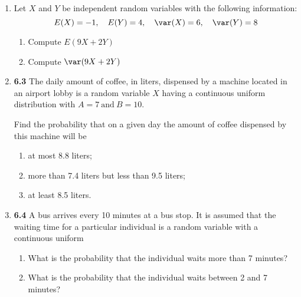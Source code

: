 \documentclass[basic, header]{nosvagor-notes}
\begin{document}
\begin{enumerate}[leftmargin=1.5em, itemsep=2em]
\begin{enumerate}[leftmargin=1.6em]
    \end{enumerate}

  \newpage %

  \item Let \(X\) and \(Y\) be independent random variables with the following
    information:
    \[%
     E(X) = -1, \quad E(Y) = 4, \quad \var(X) = 6, \quad \var(Y) = 8
    \]%
    \begin{enumerate}[leftmargin=1.6em]

      \item Compute \(E(9X + 2Y)\)
      \item Compute \(\var(9X + 2Y)\)

    \end{enumerate}

  \item \textbf{6.3} The daily amount of coffee, in liters, dispensed by a
    machine located in an airport lobby is a random variable \(X\) having a
    continuous uniform distribution with \(A = 7 ~\text{and}~ B = 10\).

    Find the probability that on a given day the amount of coffee dispensed by
    this machine will be
    \begin{enumerate}[leftmargin=1.6em]

      \item at most 8.8 liters;

      \item more than 7.4 liters but less than 9.5 liters;

      \item at least 8.5 liters.

    \end{enumerate}

  \item \textbf{6.4} A bus arrives every 10 minutes at a bus stop. It is
    assumed that the waiting time for a particular individual is a random
    variable with a continuous uniform
    \begin{enumerate}[leftmargin=1.6em]

      \item What is the probability that the individual waits more than 7
        minutes?

      \item  What is the probability that the individual waits between 2 and 7
        minutes?

    \end{enumerate}

\end{enumerate}
\end{document}
